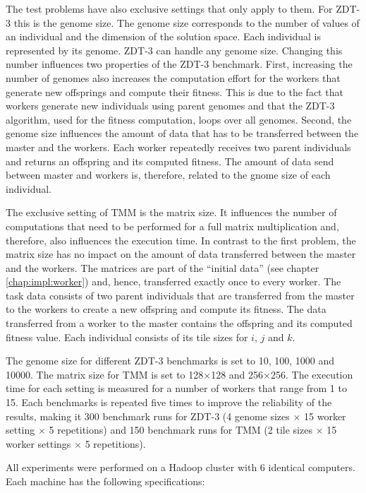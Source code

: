 The test problems have also exclusive settings that only apply to them. For ZDT-3 this is the genome size. The genome size corresponds to the number of values of an individual and the dimension of the solution space. Each individual is represented by its genome. ZDT-3 can handle any genome size. Changing this number influences two properties of the ZDT-3 benchmark. First, increasing the number of genomes also increases the computation effort for the workers that generate new offsprings and compute their fitness. This is due to the fact that workers generate new individuals using parent genomes and that the ZDT-3 algorithm, used for the fitness computation, loops over all genomes. Second, the genome size influences the amount of data that has to be transferred between the master and the workers. Each worker repeatedly receives two parent individuals and returns an offspring and its computed fitness. The amount of data send between master and workers is, therefore, related to the gnome size of each individual.

The exclusive setting of TMM is the matrix size. It influences the number of computations that need to be performed for a full matrix multiplication and, therefore, also influences the execution time. In contrast to the first problem, the matrix size has no impact on the amount of data transferred between the master and the workers. The matrices are part of the ``initial data'' (see chapter \ref{chap:impl:worker}) and, hence, transferred exactly once to every worker. The task data consists of two parent individuals that are transferred from the master to the workers to create a new offspring and compute its fitness. The data transferred from a worker to the master contains the offspring and its computed fitness value. Each individual consists of its tile sizes for $i$, $j$ and $k$.

The genome size for different ZDT-3 benchmarks is set to 10, 100, 1000 and 10000. The matrix size for TMM is set to 128$\times$128 and 256$\times$256. The execution time for each setting is measured for a number of workers that range from 1 to 15. Each benchmarks is repeated five times to improve the reliability of the results, making it 300 benchmark runs for ZDT-3 (4 genome sizes $\times$ 15 worker setting $\times$ 5 repetitions) and 150 benchmark runs for TMM (2 tile sizes $\times$ 15 worker settings $\times$ 5 repetitions).

All experiments were performed on a Hadoop cluster with 6 identical computers. Each machine has the following specifications:

